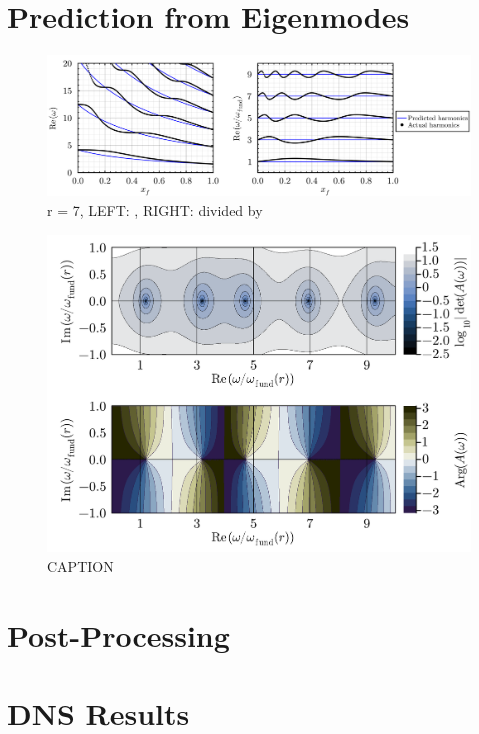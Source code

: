 \section{Prediction from Eigenmodes}


\begin{figure}[t]
\centering
\includegraphics[scale=0.35]{assets/graphs/r=7_harmonics_both.pdf}
\caption{r = 7, LEFT: , RIGHT: divided by }
\label{fig:flame-harmonics}
\end{figure}
    
\begin{figure}[t]
\centering
\includegraphics[scale=0.35]{assets/graphs/r=7_xf=05_complex_harmonics.pdf}
\caption{CAPTION}
\label{fig:flame-harmonics-complex}
\end{figure}
    
    


\section{Post-Processing}



\section{DNS Results}


